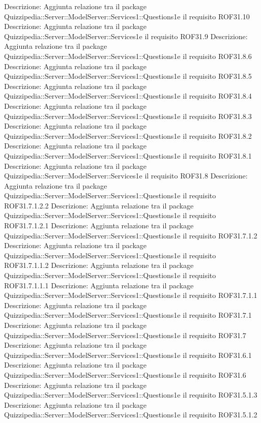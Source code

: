 Descrizione: Aggiunta relazione tra il package Quizzipedia::Server::ModelServer::Services1::Questions1e il requisito ROF31.10 
Descrizione: Aggiunta relazione tra il package Quizzipedia::Server::ModelServer::Services1e il requisito ROF31.9 
Descrizione: Aggiunta relazione tra il package Quizzipedia::Server::ModelServer::Services1::Questions1e il requisito ROF31.8.6 
Descrizione: Aggiunta relazione tra il package Quizzipedia::Server::ModelServer::Services1::Questions1e il requisito ROF31.8.5 
Descrizione: Aggiunta relazione tra il package Quizzipedia::Server::ModelServer::Services1::Questions1e il requisito ROF31.8.4 
Descrizione: Aggiunta relazione tra il package Quizzipedia::Server::ModelServer::Services1::Questions1e il requisito ROF31.8.3 
Descrizione: Aggiunta relazione tra il package Quizzipedia::Server::ModelServer::Services1::Questions1e il requisito ROF31.8.2 
Descrizione: Aggiunta relazione tra il package Quizzipedia::Server::ModelServer::Services1::Questions1e il requisito ROF31.8.1 
Descrizione: Aggiunta relazione tra il package Quizzipedia::Server::ModelServer::Services1e il requisito ROF31.8 
Descrizione: Aggiunta relazione tra il package Quizzipedia::Server::ModelServer::Services1::Questions1e il requisito ROF31.7.1.2.2 
Descrizione: Aggiunta relazione tra il package Quizzipedia::Server::ModelServer::Services1::Questions1e il requisito ROF31.7.1.2.1 
Descrizione: Aggiunta relazione tra il package Quizzipedia::Server::ModelServer::Services1::Questions1e il requisito ROF31.7.1.2 
Descrizione: Aggiunta relazione tra il package Quizzipedia::Server::ModelServer::Services1::Questions1e il requisito ROF31.7.1.1.2 
Descrizione: Aggiunta relazione tra il package Quizzipedia::Server::ModelServer::Services1::Questions1e il requisito ROF31.7.1.1.1 
Descrizione: Aggiunta relazione tra il package Quizzipedia::Server::ModelServer::Services1::Questions1e il requisito ROF31.7.1.1 
Descrizione: Aggiunta relazione tra il package Quizzipedia::Server::ModelServer::Services1::Questions1e il requisito ROF31.7.1 
Descrizione: Aggiunta relazione tra il package Quizzipedia::Server::ModelServer::Services1::Questions1e il requisito ROF31.7 
Descrizione: Aggiunta relazione tra il package Quizzipedia::Server::ModelServer::Services1::Questions1e il requisito ROF31.6.1 
Descrizione: Aggiunta relazione tra il package Quizzipedia::Server::ModelServer::Services1::Questions1e il requisito ROF31.6 
Descrizione: Aggiunta relazione tra il package Quizzipedia::Server::ModelServer::Services1::Questions1e il requisito ROF31.5.1.3 
Descrizione: Aggiunta relazione tra il package Quizzipedia::Server::ModelServer::Services1::Questions1e il requisito ROF31.5.1.2 
